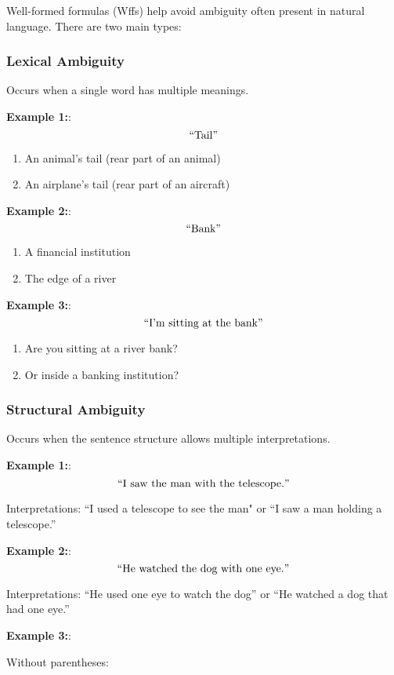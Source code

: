 \documentclass[12pt,a4paper,openany]{article}
\begin{document}
Well-formed formulas (Wffs) help avoid ambiguity often present in natural language. There are two main types:

\subsubsection{Lexical Ambiguity}

Occurs when a single word has multiple meanings.

\textbf{Example 1:}: $$``\text{Tail}"$$

\begin{enumerate}
\item An animal's tail (rear part of an animal)
\item An airplane's tail (rear part of an aircraft)
\end{enumerate}

\textbf{Example 2:}: $$``\text{Bank}"$$

\begin{enumerate}
\item A financial institution
\item The edge of a river
\end{enumerate}

\textbf{Example 3:}: $$``\text{I'm sitting at the bank}"$$

\begin{enumerate}
\item Are you sitting at a river bank?
\item Or inside a banking institution?
\end{enumerate}

\subsubsection{Structural Ambiguity}

Occurs when the sentence structure allows multiple interpretations.

\textbf{Example 1:}: $$``\text{I saw the man with the telescope.}"$$

Interpretations: ``I used a telescope to see the man" or ``I saw a man holding a telescope.''

\textbf{Example 2:}: $$``\text{He watched the dog with one eye.}"$$

Interpretations: ``He used one eye to watch the dog'' or ``He watched a dog that had one eye.''

\textbf{Example 3:}:

Without parentheses:
\end{document}
